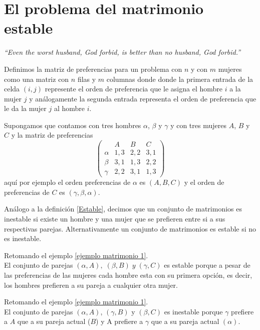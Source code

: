 \section{El problema del matrimonio estable}
\begin{flushright}
\textit{``Even the worst husband, God forbid, is better than no husband, God forbid.''}
\end{flushright}
\begin{dfn}
Definimos la matriz de preferencias para un problema con $n$ y con $m$ mujeres como una matriz con $n$ filas y $m$ columnas donde donde la primera entrada de la celda $(i,j)$ represente el orden de preferencia que le asigna el hombre $i$ a la mujer $j$ y análogamente la segunda entrada representa el orden de preferencia que le da la mujer $j$ al hombre $i$.
\end{dfn}
\begin{eje}
\label{ejemplo matrimonio 1}
Supongamos que contamos con tres hombres $\alpha$, $\beta$ y $\gamma$ y con tres mujeres $A$, $B$ y $C$ y la matriz de preferencias
$$\begin{pmatrix}
& A & B & C \\
\alpha & 1,3 & 2,2 & 3,1 \\
\beta & 3,1 & 1,3 & 2,2 \\
\gamma & 2,2 & 3,1 & 1,3 
\end{pmatrix}$$
aquí por ejemplo el orden preferencias de $\alpha$ es $(A,B,C)$ y el orden de preferencias de $C$ es $(\gamma, \beta, \alpha)$.
\end{eje}

\begin{dfn}
Análogo a la definición \ref{Estable},
decimos que un conjunto de matrimonios es inestable si existe un hombre y una mujer que se prefieren entre si a sus respectivas parejas. Alternativamente un conjunto de matrimonios es estable si no es inestable. 
\end{dfn}

\begin{eje}
Retomando el ejemplo \ref{ejemplo matrimonio 1}. \\
El conjunto de parejas $(\alpha, A), \; (\beta, B)\; y\; (\gamma, C)$ es estable porque a pesar de las preferencias de las mujeres cada hombre esta con su primera opción, es decir, los hombres prefieren a su pareja a cualquier otra mujer.\\ 

\end{eje}
\begin{eje}
Retomando el ejemplo \ref{ejemplo matrimonio 1}. \\
El conjunto de parejas $(\alpha, A)$, $(\gamma, B)$ y $(\beta, C)$ es inestable porque $\gamma$ prefiere a $A$ que a su pareja actual ($B$) y A prefiere a $\gamma$ que a su pareja actual $(\alpha)$.
\end{eje}
